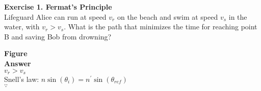\documentclass[main.tex]{subfiles}
\begin{document}
\textbf{Exercise 1. Fermat's Principle}\\
Lifeguard Alice can run at speed $v_r$ on the beach and swim at speed $v_s$ in the water, with $v_r > v_s$. What is the path that minimizes the time for reaching point B and saving Bob from drowning?

\textbf{Figure}\\

\textbf{Answer}\\
$v_r > v_s$ \\
Snell's law: $n\sin(\theta_i) = n^{\prime} \sin(\theta_{ref})$\\
$\because$ 
\end{document}
